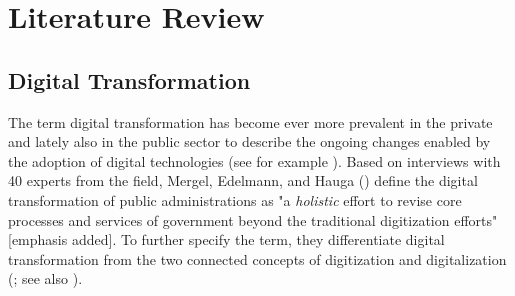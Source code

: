 \section{Literature Review}
\subsection{Digital Transformation}\label{Digital Transformation}
The term digital transformation has become ever more prevalent in the private and lately also in the public sector to describe the ongoing changes enabled by the adoption of digital technologies (see for example \cite{McKinsey2018,BehordenSpiegel2020,Tabrizi2019}). Based on interviews with 40 experts from the field, Mergel, Edelmann, and Hauga (\cite*[p. 12]{Mergel2019a}) define the digital transformation of public administrations as "a \textit{holistic} effort to revise core processes and services of government beyond the traditional digitization efforts" [emphasis added]. To further specify the term, they differentiate digital transformation from the two connected concepts of digitization and digitalization (\cite{Mergel2019a}; see also \cite{Bloomberg2018, Brennen2015}).\par 

